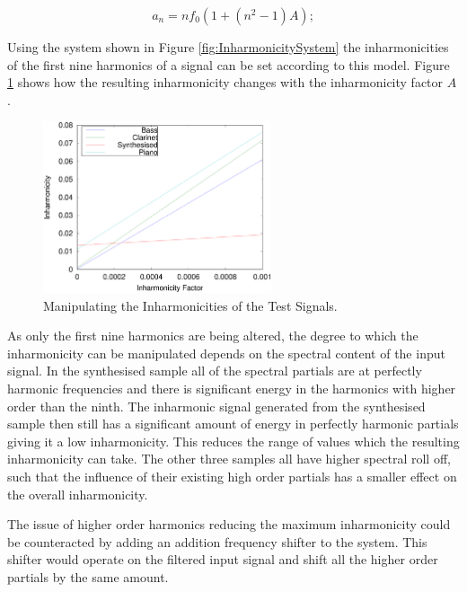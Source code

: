 			\begin{equation}
				a_{n} = nf_{0} \left( 1 + \left( n^{2} - 1 \right) A \right);
				\label{eq:PianoInharmonicity}
			\end{equation}

			Using the system shown in Figure \ref{fig:InharmonicitySystem} the inharmonicities of the first
			nine harmonics of a signal can be set according to this model. Figure \ref{fig:MoveInharmonicities}
			shows how the resulting inharmonicity changes with the inharmonicity factor $A$.

			\begin{figure}[h!]
				\centering
				\includegraphics[width=0.6\textwidth]{chapter6/Images/MoveInharmonicities.eps}
				\caption{Manipulating the Inharmonicities of the Test Signals.}
				\label{fig:MoveInharmonicities}
			\end{figure}

			As only the first nine harmonics are being altered, the degree to which the inharmonicity can be
			manipulated depends on the spectral content of the input signal. In the synthesised sample all of
			the spectral partials are at perfectly harmonic frequencies and there is significant energy in the
			harmonics with higher order than the ninth. The inharmonic signal generated from the synthesised
			sample then still has a significant amount of energy in perfectly harmonic partials giving it a low
			inharmonicity. This reduces the range of values which the resulting inharmonicity can take. The
			other three samples all have higher spectral roll off, such that the influence of their existing
			high order partials has a smaller effect on the overall inharmonicity.

			The issue of higher order harmonics reducing the maximum inharmonicity could be counteracted by
			adding an addition frequency shifter to the system. This shifter would operate on the filtered
			input signal and shift all the higher order partials by the same amount.

